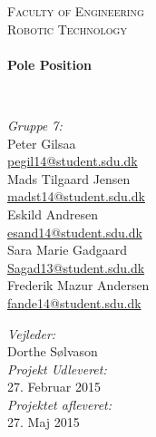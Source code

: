 \begin{titlepage}
\begin{center}




\textsc{\huge \color{sdu_grey} Faculty of Engineering}\\[0.5cm]

\textsc{\LARGE \color{sdu_grey} Robotic Technology}\\[0.5cm]

\HRule \\[1ex]
{ \Huge \bfseries Pole Position \\[1ex] }

\HRule \\[1.5cm]

\begin{minipage}{0.50\textwidth}
\begin{flushleft}\large
\emph{Gruppe 7:}\\
Peter Gilsaa \\
\href{mailto:pegil14@student.sdu.dk}{\color{sdu_blue}pegil14@student.sdu.dk}\\
Mads Tilgaard Jensen\\
\href{mailto:madst14@student.sdu.dk}{\color{sdu_blue}madst14@student.sdu.dk}\\
Eskild Andresen\\
\href{mailto:esand14@student.sdu.dk}{\color{sdu_blue}esand14@student.sdu.dk}\\
Sara Marie Gadgaard\\
\href{mailto:Sagad13@student.sdu.dk}{\color{sdu_blue}Sagad13@student.sdu.dk}\\
Frederik Mazur Andersen\\
\href{mailto:fande14@student.sdu.dk}{\color{sdu_blue}fande14@student.sdu.dk}\\
\end{flushleft}
\end{minipage}
\begin{minipage}[c][2cm]{0.45\textwidth}
\begin{flushright} \large
\vspace{2cm}
\emph{Vejleder:} \\
Dorthe Sølvason  \\
\vspace{2cm}
\emph{Projekt Udleveret:} \\
27. Februar 2015 \\
\emph{Projektet afleveret:} \\
27. Maj 2015
\end{flushright}
\end{minipage}


\end{center}
\end{titlepage}
